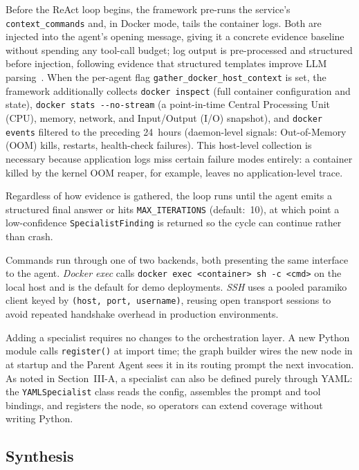 \documentclass[conference]{IEEEtran}
\begin{document}
Before the ReAct loop begins, the framework pre-runs the service's
\texttt{context\_commands} and, in Docker mode, tails the container
logs. Both are injected into the agent's opening message, giving it
a concrete evidence baseline without spending any tool-call budget; log output is
pre-processed and structured before injection, following evidence
that structured templates improve LLM parsing~\cite{xu2024divlog}.
When the per-agent flag \texttt{gather\_docker\_host\_context} is
set, the framework additionally collects \texttt{docker inspect}
(full container configuration and state), \texttt{docker stats
-{}-no-stream} (a point-in-time Central Processing Unit (CPU), memory, network, and Input/Output (I/O)
snapshot), and \texttt{docker events} filtered to the preceding
24~hours (daemon-level signals: Out-of-Memory (OOM) kills, restarts, health-check
failures). This host-level collection is necessary because application logs
miss certain failure modes entirely: a container killed by the
kernel OOM reaper, for example, leaves no application-level trace.

Regardless of how evidence is gathered, the loop runs until the agent emits a structured final answer or
hits \texttt{MAX\_ITERATIONS} (default:~10), at which point a
low-confidence \texttt{SpecialistFinding} is returned so the cycle
can continue rather than crash.

Commands run through one of two backends, both presenting the same
interface to the agent. \textit{Docker exec} calls
\texttt{docker exec <container> sh -c <cmd>} on the local host and
is the default for demo deployments. \textit{SSH} uses a pooled
paramiko client keyed by \texttt{(host, port, username)}, reusing
open transport sessions to avoid repeated handshake overhead in
production environments.

Adding a specialist requires no changes to the orchestration layer.
A new Python module calls \texttt{register()} at import time; the graph
builder wires the new node in at startup and the Parent Agent sees it
in its routing prompt the next invocation. As noted in
Section~III-A, a specialist can also be defined purely through YAML:
the \texttt{YAMLSpecialist} class reads the config, assembles the
prompt and tool bindings, and registers the node, so operators can
extend coverage without writing Python.

\subsection{Synthesis}
\end{document}
